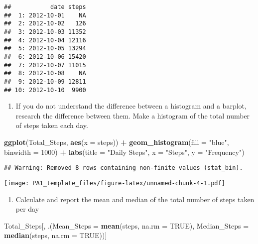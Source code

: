 \documentclass[]{article}
\newenvironment{Shaded}{\begin{snugshade}}{\end{snugshade}}
\newcommand{\KeywordTok}[1]{\textcolor[rgb]{0.13,0.29,0.53}{\textbf{#1}}}
\newcommand{\DataTypeTok}[1]{\textcolor[rgb]{0.13,0.29,0.53}{#1}}
\newcommand{\DecValTok}[1]{\textcolor[rgb]{0.00,0.00,0.81}{#1}}
\newcommand{\StringTok}[1]{\textcolor[rgb]{0.31,0.60,0.02}{#1}}
\newcommand{\OtherTok}[1]{\textcolor[rgb]{0.56,0.35,0.01}{#1}}
\newcommand{\OperatorTok}[1]{\textcolor[rgb]{0.81,0.36,0.00}{\textbf{#1}}}
\newcommand{\NormalTok}[1]{#1}
\providecommand{\tightlist}{%
  \setlength{\itemsep}{0pt}\setlength{\parskip}{0pt}}
\begin{document}
\begin{verbatim}
##           date steps
##  1: 2012-10-01    NA
##  2: 2012-10-02   126
##  3: 2012-10-03 11352
##  4: 2012-10-04 12116
##  5: 2012-10-05 13294
##  6: 2012-10-06 15420
##  7: 2012-10-07 11015
##  8: 2012-10-08    NA
##  9: 2012-10-09 12811
## 10: 2012-10-10  9900
\end{verbatim}

\begin{enumerate}
\def\labelenumi{\arabic{enumi}.}
\setcounter{enumi}{1}
\tightlist
\item
  If you do not understand the difference between a histogram and a
  barplot, research the difference between them. Make a histogram of the
  total number of steps taken each day.
\end{enumerate}

\begin{Shaded}
\begin{Highlighting}[]
\KeywordTok{ggplot}\NormalTok{(Total_Steps, }\KeywordTok{aes}\NormalTok{(}\DataTypeTok{x =}\NormalTok{ steps)) }\OperatorTok{+}
\StringTok{    }\KeywordTok{geom_histogram}\NormalTok{(}\DataTypeTok{fill =} \StringTok{"blue"}\NormalTok{, }\DataTypeTok{binwidth =} \DecValTok{1000}\NormalTok{) }\OperatorTok{+}
\StringTok{    }\KeywordTok{labs}\NormalTok{(}\DataTypeTok{title =} \StringTok{"Daily Steps"}\NormalTok{, }\DataTypeTok{x =} \StringTok{"Steps"}\NormalTok{, }\DataTypeTok{y =} \StringTok{"Frequency"}\NormalTok{)}
\end{Highlighting}
\end{Shaded}

\begin{verbatim}
## Warning: Removed 8 rows containing non-finite values (stat_bin).
\end{verbatim}

\texttt{[image: PA1\_template\_files/figure-latex/unnamed-chunk-4-1.pdf]}

\begin{enumerate}
\def\labelenumi{\arabic{enumi}.}
\setcounter{enumi}{2}
\tightlist
\item
  Calculate and report the mean and median of the total number of steps
  taken per day
\end{enumerate}

\begin{Shaded}
\begin{Highlighting}[]
\NormalTok{Total_Steps[, .(}\DataTypeTok{Mean_Steps =} \KeywordTok{mean}\NormalTok{(steps, }\DataTypeTok{na.rm =} \OtherTok{TRUE}\NormalTok{), }\DataTypeTok{Median_Steps =} \KeywordTok{median}\NormalTok{(steps, }\DataTypeTok{na.rm =} \OtherTok{TRUE}\NormalTok{))]}
\end{Highlighting}
\end{Shaded}
\end{document}

